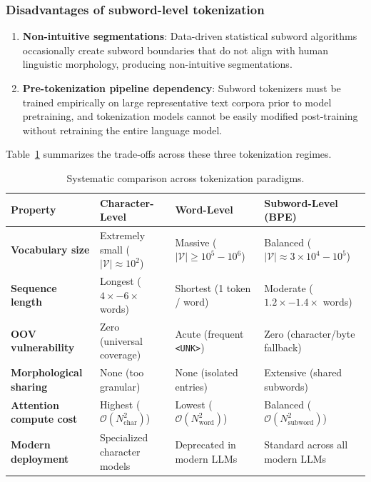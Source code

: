 \documentclass[../../../main.tex]{subfiles}
\begin{document}
\subsubsection{Disadvantages of subword-level tokenization}
\begin{enumerate}
    \item \textbf{Non-intuitive segmentations}: Data-driven statistical subword algorithms occasionally create subword boundaries that do not align with human linguistic morphology, producing non-intuitive segmentations.
    \item \textbf{Pre-tokenization pipeline dependency}: Subword tokenizers must be trained empirically on large representative text corpora prior to model pretraining, and tokenization models cannot be easily modified post-training without retraining the entire language model.
\end{enumerate}

Table~\ref{tab:tokenization_comparison_spectrum} summarizes the trade-offs across these three tokenization regimes.

\begin{table}[htbp]
\centering
\small
\caption{Systematic comparison across tokenization paradigms.}
\label{tab:tokenization_comparison_spectrum}
\begin{tabularx}{\textwidth}{lXXX}
\toprule
\textbf{Property} & \textbf{Character-Level} & \textbf{Word-Level} & \textbf{Subword-Level (BPE)} \\
\midrule
\textbf{Vocabulary size} & Extremely small ($|\mathcal{V}| \approx 10^2$) & Massive ($|\mathcal{V}| \ge 10^5 - 10^6$) & Balanced ($|\mathcal{V}| \approx 3 \times 10^4 - 10^5$) \\
\textbf{Sequence length} & Longest ($4\times - 6\times$ words) & Shortest (1 token / word) & Moderate ($1.2\times - 1.4\times$ words) \\
\textbf{OOV vulnerability} & Zero (universal coverage) & Acute (frequent \texttt{<UNK>}) & Zero (character/byte fallback) \\
\textbf{Morphological sharing} & None (too granular) & None (isolated entries) & Extensive (shared subwords) \\
\textbf{Attention compute cost} & Highest ($\mathcal{O}(N_{\text{char}}^2)$) & Lowest ($\mathcal{O}(N_{\text{word}}^2)$) & Balanced ($\mathcal{O}(N_{\text{subword}}^2)$) \\
\textbf{Modern deployment} & Specialized character models & Deprecated in modern LLMs & Standard across all modern LLMs \\
\bottomrule
\end{tabularx}
\end{table}
\end{document}
